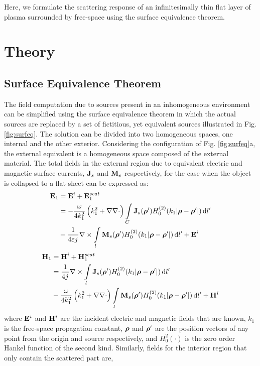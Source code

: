 \documentclass[12pt]{article}
\begin{document}
Here, we formulate the scattering response of an infinitesimally thin flat layer of plasma surrounded by free-space using the surface equivalence theorem.


\section{Theory}
%
\subsection{Surface Equivalence Theorem}
%
The field computation due to sources present in an inhomogeneous environment can be simplified using the surface equivalence theorem in which the actual sources are replaced by a set of fictitious, yet equivalent sources illustrated in Fig. \ref{fig:surfeq}. The solution can be divided into two homogeneous spaces, one internal and the other exterior. Considering the configuration of Fig. \ref{fig:surfeq}a, the external equivalent is a homogeneous space composed of the external material. The total fields in the external region due to equivalent electric and magnetic surface currents, $\mathbf{J}_s$ and $\mathbf{M}_s$ respectively, for the case when the object is collapsed to a flat sheet can be expressed as:
%
\begin{equation}
  \begin{split}
    \mathbf{E}_1 &= \mathbf{E}^i + \mathbf{E}_1^{scat} \\
    &=  -\frac{\omega}{4 k_1^2} \left( k_1^2 + \nabla \nabla \cdot \right) \int\limits_{C} \mathbf{J}_s(\boldsymbol {\rho}') H_0^{(2)}(k_1 |\boldsymbol {\rho} - \boldsymbol {\rho}'|) \mathop{}\!\mathrm{d}{l'} \\
    &- \frac{1}{4 \varepsilon {j}\mkern1mu} \nabla \times \int\limits_{l} \mathbf{M}_s(\boldsymbol {\rho}') H_0^{(2)}(k_1 |\boldsymbol {\rho} - \boldsymbol {\rho}'|) \mathop{}\!\mathrm{d}{l'} + \mathbf{E}^i
  \end{split}
  \label{eq:E1sc}
\end{equation}
%
\begin{equation}
  \begin{split}
    \mathbf{H}_1 &= \mathbf{H}^i + \mathbf{H}_1^{scat} \\
    &= \frac{1}{4 {j}\mkern1mu} \nabla \times \int\limits_{l} \mathbf{J}_s(\boldsymbol {\rho}') H_0^{(2)}(k_1 |\boldsymbol {\rho} - \boldsymbol {\rho}'|) \mathop{}\!\mathrm{d}{l'} \\
    &-\frac{\omega}{4 k_1^2} \left( k_1^2 + \nabla \nabla \cdot \right) \int\limits_{l} \mathbf{M}_s(\boldsymbol {\rho}') H_0^{(2)}(k_1 |\boldsymbol {\rho} - \boldsymbol {\rho}'|) \mathop{}\!\mathrm{d}{l'} + \mathbf{H}^i
  \end{split}
  \label{eq:H1sc}
\end{equation}
%
where $\mathbf{E}^i$ and $\mathbf{H}^i$ are the incident electric and magnetic fields that are known, $k_1$ is the free-space propagation constant, $\boldsymbol {\rho}$ and $\boldsymbol {\rho}'$ are the position vectors of any point from the origin and source respectively, and $H_0^2(\cdot)$ is the zero order Hankel function of the second kind.  Similarly, fields for the interior region that only contain the scattered part are,
\end{document}
